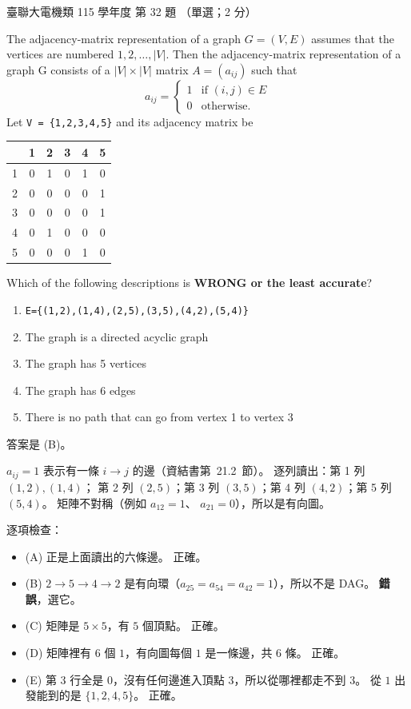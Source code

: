 \begin{pastexam}[label={px:ust-115-ee-ds-32}]{臺聯大電機類 115 學年度 第 32 題}
（單選；2 分）

The adjacency-matrix representation of a graph $G=(V,E)$ assumes that the vertices are numbered
$1, 2, \ldots, |V|$. Then the adjacency-matrix representation of a graph G consists of a
$|V|\times|V|$ matrix $A=(a_{ij})$ such that
\[ a_{ij}=\begin{cases}1 & \text{if } (i,j)\in E\\ 0 & \text{otherwise.}\end{cases} \]
Let \texttt{V = \{1,2,3,4,5\}} and its adjacency matrix be

\begin{center}
\begin{tabular}{|c|c|c|c|c|c|}\hline
  & 1 & 2 & 3 & 4 & 5\\\hline
1 & 0 & 1 & 0 & 1 & 0\\\hline
2 & 0 & 0 & 0 & 0 & 1\\\hline
3 & 0 & 0 & 0 & 0 & 1\\\hline
4 & 0 & 1 & 0 & 0 & 0\\\hline
5 & 0 & 0 & 0 & 1 & 0\\\hline
\end{tabular}
\end{center}

Which of the following descriptions is \textbf{WRONG or the least accurate}?
\begin{enumerate}[label=(\Alph*)]
\item \texttt{E=\{(1,2),(1,4),(2,5),(3,5),(4,2),(5,4)\}}
\item The graph is a directed acyclic graph
\item The graph has 5 vertices
\item The graph has 6 edges
\item There is no path that can go from vertex 1 to vertex 3
\end{enumerate}
\end{pastexam}

\begin{pastsoln}
答案是 (B)。

$a_{ij} = 1$ 表示有一條 $i \to j$ 的邊（資結書第~21.2~節）。 逐列讀出：第 1 列 $(1,2), (1,4)$；
第 2 列 $(2,5)$；第 3 列 $(3,5)$；第 4 列 $(4,2)$；第 5 列 $(5,4)$。 矩陣不對稱（例如 $a_{12} = 1$、
$a_{21} = 0$），所以是有向圖。

逐項檢查：
\begin{itemize}
\item (A) 正是上面讀出的六條邊。 正確。
\item (B) $2 \to 5 \to 4 \to 2$ 是有向環（$a_{25} = a_{54} = a_{42} = 1$），所以不是 DAG。
\textbf{錯誤}，選它。
\item (C) 矩陣是 $5 \times 5$，有 $5$ 個頂點。 正確。
\item (D) 矩陣裡有 $6$ 個 $1$，有向圖每個 $1$ 是一條邊，共 $6$ 條。 正確。
\item (E) 第 3 行全是 $0$，沒有任何邊進入頂點 $3$，所以從哪裡都走不到 $3$。 從 $1$ 出發能到的是
$\{1, 2, 4, 5\}$。 正確。
\end{itemize}
\end{pastsoln}
